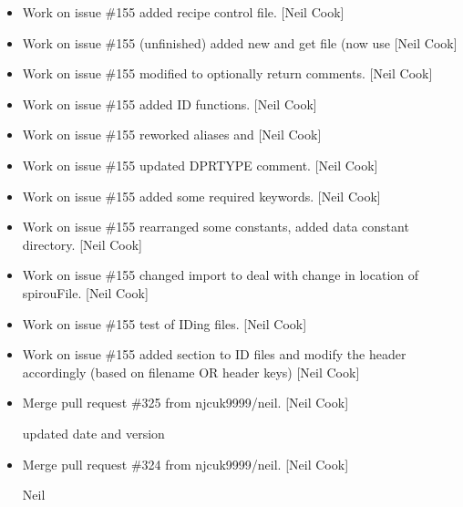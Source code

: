\documentclass[a4paper,10pt,english]{report}
\begin{document}
\label{\detokenize{misc/changelog:id441}}\begin{itemize}
\item {} 
Work on issue \#155 \sphinxhyphen{} added recipe control file. {[}Neil Cook{]}

\item {} 
Work on issue \#155 \sphinxhyphen{} (un\sphinxhyphen{}finished) added new  and
get file (now use  {[}Neil Cook{]}

\item {} 
Work on issue \#155 \sphinxhyphen{} modified  to optionally return
comments. {[}Neil Cook{]}

\item {} 
Work on issue \#155 \sphinxhyphen{} added ID functions. {[}Neil Cook{]}

\item {} 
Work on issue \#155 \sphinxhyphen{} reworked aliases and  {[}Neil Cook{]}

\item {} 
Work on issue \#155 \sphinxhyphen{} updated DPRTYPE comment. {[}Neil Cook{]}

\item {} 
Work on issue \#155 \sphinxhyphen{} added some required keywords. {[}Neil Cook{]}

\item {} 
Work on issue \#155 \sphinxhyphen{} rearranged some constants, added data constant
directory. {[}Neil Cook{]}

\item {} 
Work on issue \#155 \sphinxhyphen{} changed import to deal with change in location of
spirouFile. {[}Neil Cook{]}

\item {} 
Work on issue \#155 \sphinxhyphen{} test of ID\sphinxhyphen{}ing files. {[}Neil Cook{]}

\item {} 
Work on issue \#155 \sphinxhyphen{} added section to ID files and modify the header
accordingly (based on filename OR header keys) {[}Neil Cook{]}

\item {} 
Merge pull request \#325 from njcuk9999/neil. {[}Neil Cook{]}

updated date and version

\item {} 
Merge pull request \#324 from njcuk9999/neil. {[}Neil Cook{]}

Neil

\end{itemize}
\end{document}
